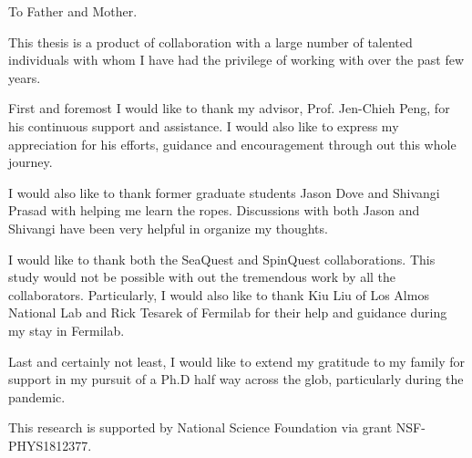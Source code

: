 \documentclass[../main.tex]{subfiles}
\begin{document}
\begin{dedication}
	To Father and Mother.
\end{dedication}

\begin{acknowledgments}
	This thesis is a product of collaboration with a large number of talented
	individuals with whom I have had the privilege of working with over the past
	few years.

	First and foremost I would like to thank my advisor, Prof. Jen-Chieh Peng, for
	his continuous support and assistance. I would also like to express my
	appreciation for his efforts, guidance and encouragement through out this whole
	journey.

	I would also like to thank former graduate students Jason Dove and Shivangi
	Prasad with helping me learn the ropes. Discussions with both Jason and
	Shivangi have been very helpful in organize my thoughts.

	I would like to thank both the SeaQuest and SpinQuest collaborations.
	This study would not be possible with out the tremendous work by all the
	collaborators. Particularly, I would also like to thank Kiu Liu of Los Almos
	National Lab and Rick Tesarek of Fermilab for their help and guidance during my
	stay in Fermilab.

	Last and certainly not least, I would like to extend my gratitude to my family 
	for support in my 	pursuit of a Ph.D half way across the glob, particularly 
	during the pandemic.

	This research is supported by National Science Foundation via grant NSF-PHYS1812377.

\end{acknowledgments}
\end{document}
